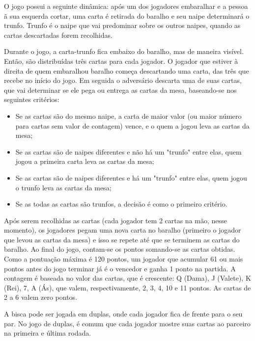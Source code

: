 \documentclass[12pt, oneside, a4paper, brazil]{abntex2}
\begin{document}
O jogo possui a seguinte dinâmica: após um dos jogadores embaralhar e a pessoa ã sua esquerda cortar, uma carta é retirada do baralho e seu naipe determinará o trunfo. Trunfo é o naipe que vai predominar sobre os outros naipes, quando as cartas descartadas forem recolhidas.

Durante o jogo, a carta-trunfo fica embaixo do baralho, mas de maneira visível. Então, são distribuídas três cartas para cada jogador. O jogador que estiver à direita de quem embaralhou baralho começa descartando uma carta, das três que recebe no início do jogo. Em seguida o adversário descarta uma de suas cartas, que vai determinar se ele pega ou entrega as cartas da mesa, baseando-se nos seguintes critérios:

\begin{itemize}
    \item Se as cartas são do mesmo naipe, a carta de maior valor (ou maior número para cartas sem valor de contagem) vence, e o quem a jogou leva as cartas da mesa;
    
    \item Se as cartas são de naipes diferentes e não há um "trunfo" entre elas, quem jogou a primeira carta leva as cartas da mesa;
    
    \item Se as cartas são de naipes diferentes e há um "trunfo" entre elas, quem jogou o trunfo leva as cartas da mesa;
    
    \item Se as todas as cartas são trunfos, a decisão é como o primeiro critério.

\end{itemize}

Após serem recolhidas as cartas (cada jogador tem 2 cartas na mão, nesse momento), os jogadores pegam uma nova carta no baralho (primeiro o jogador que levou as cartas da mesa) e isso se repete até que se terminem as cartas do baralho. Ao final do jogo, contam-se os pontos somando-se as cartas obtidas. Como a pontuação máxima é 120 pontos, um jogador que acumular 61 ou mais pontos antes do jogo terminar já é o vencedor e ganha 1 ponto na partida. A contagem é baseada no valor das cartas, que é crescente: Q (Dama), J (Valete), K (Rei), 7, A (Ás), que valem, respectivamente, 2, 3, 4, 10 e 11 pontos. As cartas de 2 a 6 valem zero pontos.

A bisca pode ser jogada em duplas, onde cada jogador fica de frente para o seu par. No jogo de duplas, é comum que cada jogador mostre suas cartas ao parceiro na primeira e última rodada.
\end{document}

